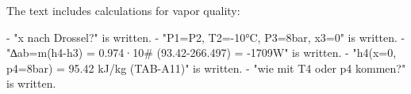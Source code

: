 The text includes calculations for vapor quality:  

- "x nach Drossel?" is written.  
- "P1=P2, T2=-10°C, P3=8bar, x3=0" is written.  
- "∆ab=m(h4-h3) = 0.974·10# (93.42-266.497) = -1709W" is written.  
- "h4(x=0, p4=8bar) = 95.42 kJ/kg (TAB-A11)" is written.  
- "wie mit T4 oder p4 kommen?" is written.